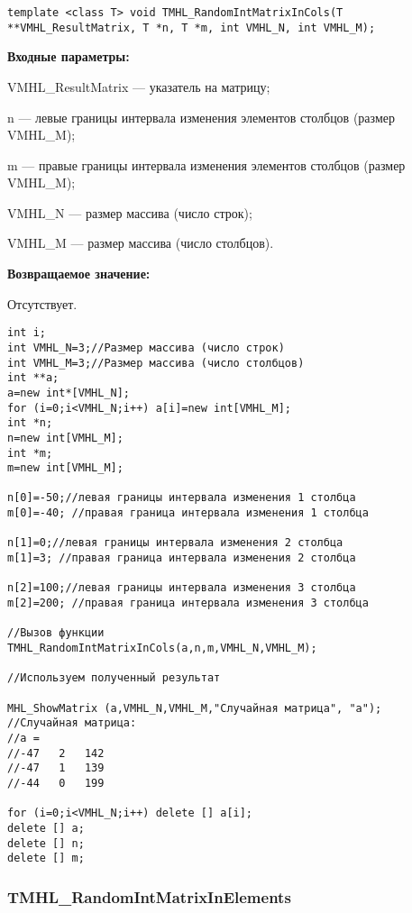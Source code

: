 \documentclass[a4paper,12pt]{article}
\begin{document}
\begin{lstlisting}[label=code_syntax_TMHL_RandomIntMatrixInCols,caption=Синтаксис]
template <class T> void TMHL_RandomIntMatrixInCols(T **VMHL_ResultMatrix, T *n, T *m, int VMHL_N, int VMHL_M);
\end{lstlisting}

\textbf{Входные параметры:}
 
VMHL\_ResultMatrix --- указатель на матрицу;
 
n --- левые границы интервала изменения элементов столбцов (размер VMHL\_M);
 
m --- правые границы интервала изменения элементов столбцов (размер VMHL\_M);
 
VMHL\_N --- размер массива (число строк);
 
VMHL\_M --- размер массива (число столбцов).

\textbf{Возвращаемое значение:}

Отсутствует.


\begin{lstlisting}[label=code_use_TMHL_RandomIntMatrixInCols,caption=Пример использования]
int i;
int VMHL_N=3;//Размер массива (число строк)
int VMHL_M=3;//Размер массива (число столбцов)
int **a;
a=new int*[VMHL_N];
for (i=0;i<VMHL_N;i++) a[i]=new int[VMHL_M];
int *n;
n=new int[VMHL_M];
int *m;
m=new int[VMHL_M];

n[0]=-50;//левая границы интервала изменения 1 столбца
m[0]=-40; //правая граница интервала изменения 1 столбца

n[1]=0;//левая границы интервала изменения 2 столбца
m[1]=3; //правая граница интервала изменения 2 столбца

n[2]=100;//левая границы интервала изменения 3 столбца
m[2]=200; //правая граница интервала изменения 3 столбца

//Вызов функции
TMHL_RandomIntMatrixInCols(a,n,m,VMHL_N,VMHL_M);

//Используем полученный результат

MHL_ShowMatrix (a,VMHL_N,VMHL_M,"Случайная матрица", "a");
//Случайная матрица:
//a =
//-47	2	142
//-47	1	139
//-44	0	199

for (i=0;i<VMHL_N;i++) delete [] a[i];
delete [] a;
delete [] n;
delete [] m;
\end{lstlisting}

\subsubsection{TMHL\_RandomIntMatrixInElements}\label{TMHL_RandomIntMatrixInElements}
\end{document}
